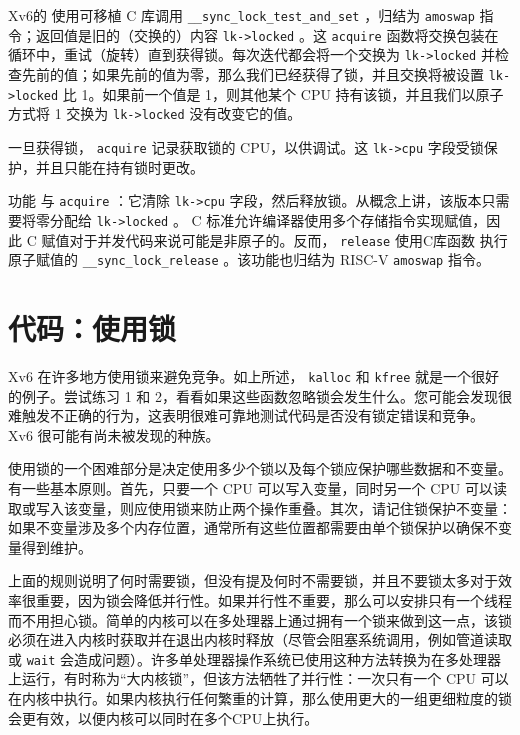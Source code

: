 \documentclass[UTF8]{article}
\begin{document}
Xv6的
        使用可移植 C 库调用
    \lstinline{__sync_lock_test_and_set}    ，归结为
    \lstinline{amoswap}    指令；返回值是旧的（交换的）内容
    \lstinline{lk->locked}    。这
    \lstinline{acquire}    函数将交换包装在循环中，重试（旋转）直到获得锁。每次迭代都会将一个交换为
    \lstinline{lk->locked}    并检查先前的值；如果先前的值为零，那么我们已经获得了锁，并且交换将被设置
    \lstinline{lk->locked}    比 1。如果前一个值是 1，则其他某个 CPU 持有该锁，并且我们以原子方式将 1 交换为
    \lstinline{lk->locked}    没有改变它的值。  

一旦获得锁，
    \lstinline{acquire}    记录获取锁的 CPU，以供调试。这
    \lstinline{lk->cpu}    字段受锁保护，并且只能在持有锁时更改。  

功能
        与
    \lstinline{acquire}    ：它清除
    \lstinline{lk->cpu}    字段，然后释放锁。从概念上讲，该版本只需要将零分配给
    \lstinline{lk->locked}    。 C 标准允许编译器使用多个存储指令实现赋值，因此 C 赋值对于并发代码来说可能是非原子的。反而，
    \lstinline{release}   使用C库函数
 执行原子赋值的    \lstinline{__sync_lock_release}   。该功能也归结为 RISC-V
    \lstinline{amoswap}    指令。
    \section{代码：使用锁  }    Xv6 在许多地方使用锁来避免竞争。如上所述，
    \lstinline{kalloc}   
        和
    \lstinline{kfree}   
        就是一个很好的例子。尝试练习 1 和 2，看看如果这些函数忽略锁会发生什么。您可能会发现很难触发不正确的行为，这表明很难可靠地测试代码是否没有锁定错误和竞争。 Xv6 很可能有尚未被发现的种族。  

使用锁的一个困难部分是决定使用多少个锁以及每个锁应保护哪些数据和不变量。有一些基本原则。首先，只要一个 CPU 可以写入变量，同时另一个 CPU 可以读取或写入该变量，则应使用锁来防止两个操作重叠。其次，请记住锁保护不变量：如果不变量涉及多个内存位置，通常所有这些位置都需要由单个锁保护以确保不变量得到维护。  

上面的规则说明了何时需要锁，但没有提及何时不需要锁，并且不要锁太多对于效率很重要，因为锁会降低并行性。如果并行性不重要，那么可以安排只有一个线程而不用担心锁。简单的内核可以在多处理器上通过拥有一个锁来做到这一点，该锁必须在进入内核时获取并在退出内核时释放（尽管会阻塞系统调用，例如管道读取或
    \lstinline{wait}    会造成问题）。许多单处理器操作系统已使用这种方法转换为在多处理器上运行，有时称为“大内核锁”，但该方法牺牲了并行性：一次只有一个 CPU 可以在内核中执行。如果内核执行任何繁重的计算，那么使用更大的一组更细粒度的锁会更有效，以便内核可以同时在多个CPU上执行。  
\end{document}
